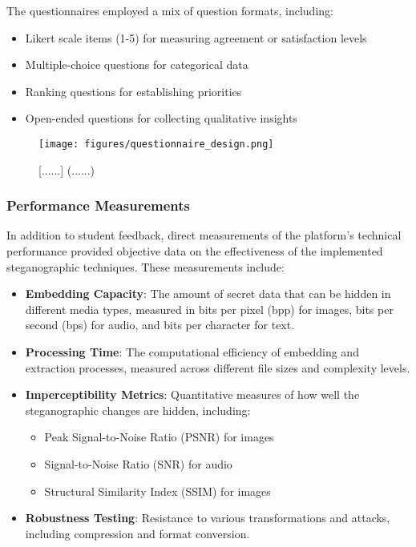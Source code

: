 \documentclass[12pt, a4paper, oneside]{book}
\begin{document}
The questionnaires employed a mix of question formats, including:
\begin{itemize}[leftmargin=*]
    \item Likert scale items (1-5) for measuring agreement or satisfaction levels
    \item Multiple-choice questions for categorical data
    \item Ranking questions for establishing priorities
    \item Open-ended questions for collecting qualitative insights
\end{itemize}

\begin{figure}[htbp]
    \centering
    \texttt{[image: figures/questionnaire\_design.png]}
    \caption{[......] (......)}
    \label{fig:questionnaire_design}
\end{figure}

\subsubsection{Performance Measurements}
In addition to student feedback, direct measurements of the platform's technical performance provided objective data on the effectiveness of the implemented steganographic techniques. These measurements include:

\begin{itemize}[leftmargin=*]
    \item \textbf{Embedding Capacity}: The amount of secret data that can be hidden in different media types, measured in bits per pixel (bpp) for images, bits per second (bps) for audio, and bits per character for text.

    \item \textbf{Processing Time}: The computational efficiency of embedding and extraction processes, measured across different file sizes and complexity levels.

    \item \textbf{Imperceptibility Metrics}: Quantitative measures of how well the steganographic changes are hidden, including:
    \begin{itemize}
        \item Peak Signal-to-Noise Ratio (PSNR) for images
        \item Signal-to-Noise Ratio (SNR) for audio
        \item Structural Similarity Index (SSIM) for images
    \end{itemize}

    \item \textbf{Robustness Testing}: Resistance to various transformations and attacks, including compression and format conversion.
\end{itemize}
\end{document}
